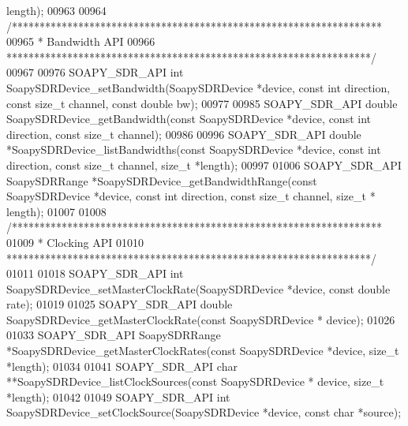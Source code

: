 \begin{DoxyCode}
      length);
00963 
00964 \textcolor{comment}{/*******************************************************************}
00965 \textcolor{comment}{ * Bandwidth API}
00966 \textcolor{comment}{ ******************************************************************/}
00967 
00976 SOAPY_SDR_API \textcolor{keywordtype}{int} SoapySDRDevice_setBandwidth(SoapySDRDevice *device, \textcolor{keyword}{const} \textcolor{keywordtype}{int} direction, \textcolor{keyword}{const} \textcolor{keywordtype}{size\_t} 
      channel, \textcolor{keyword}{const} \textcolor{keywordtype}{double} bw);
00977 
00985 SOAPY_SDR_API \textcolor{keywordtype}{double} SoapySDRDevice_getBandwidth(\textcolor{keyword}{const} SoapySDRDevice *device, \textcolor{keyword}{const} \textcolor{keywordtype}{int} direction, \textcolor{keyword}{const} \textcolor{keywordtype}{
      size\_t} channel);
00986 
00996 SOAPY_SDR_API \textcolor{keywordtype}{double} *SoapySDRDevice_listBandwidths(\textcolor{keyword}{const} SoapySDRDevice *device, \textcolor{keyword}{const} \textcolor{keywordtype}{int} direction, \textcolor{keyword}{
      const} \textcolor{keywordtype}{size\_t} channel, \textcolor{keywordtype}{size\_t} *length);
00997 
01006 SOAPY_SDR_API SoapySDRRange *SoapySDRDevice_getBandwidthRange(\textcolor{keyword}{const} 
      SoapySDRDevice *device, \textcolor{keyword}{const} \textcolor{keywordtype}{int} direction, \textcolor{keyword}{const} \textcolor{keywordtype}{size\_t} channel, \textcolor{keywordtype}{size\_t} *
      length);
01007 
01008 \textcolor{comment}{/*******************************************************************}
01009 \textcolor{comment}{ * Clocking API}
01010 \textcolor{comment}{ ******************************************************************/}
01011 
01018 SOAPY_SDR_API \textcolor{keywordtype}{int} SoapySDRDevice_setMasterClockRate(SoapySDRDevice *device, \textcolor{keyword}{const} \textcolor{keywordtype}{double} 
      rate);
01019 
01025 SOAPY_SDR_API \textcolor{keywordtype}{double} SoapySDRDevice_getMasterClockRate(\textcolor{keyword}{const} SoapySDRDevice *
      device);
01026 
01033 SOAPY_SDR_API SoapySDRRange *SoapySDRDevice_getMasterClockRates(\textcolor{keyword}{const} 
      SoapySDRDevice *device, \textcolor{keywordtype}{size\_t} *length);
01034 
01041 SOAPY_SDR_API \textcolor{keywordtype}{char} **SoapySDRDevice_listClockSources(\textcolor{keyword}{const} SoapySDRDevice *
      device, \textcolor{keywordtype}{size\_t} *length);
01042 
01049 SOAPY_SDR_API \textcolor{keywordtype}{int} SoapySDRDevice_setClockSource(SoapySDRDevice *device, \textcolor{keyword}{const} \textcolor{keywordtype}{char} *source);

\end{DoxyCode}
